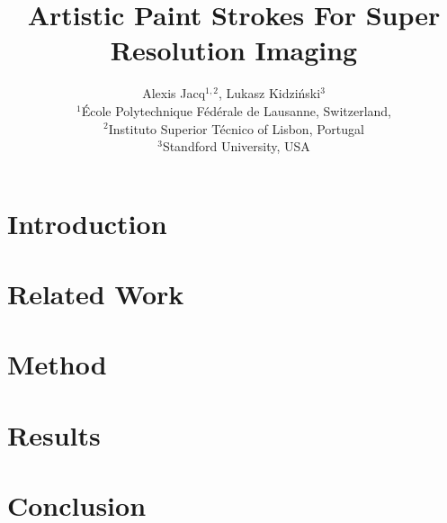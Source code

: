 \documentclass[10pt,a4paper]{article}
\begin{document}
\title{Artistic Paint Strokes For Super Resolution Imaging}


\author{Alexis Jacq$^{1,2}$, Lukasz Kidzi\'nski$^{3}$ \\
$^1$\'Ecole Polytechnique F\'ed\'erale de Lausanne, Switzerland,\\
$^2$Instituto Superior T\'{e}cnico of Lisbon, Portugal\\
$^3$Standford University, USA}




\maketitle

\section*{Introduction}


\section*{Related Work}


\section*{Method}


\section*{Results}


\section*{Conclusion}


\small
 
\end{document}

